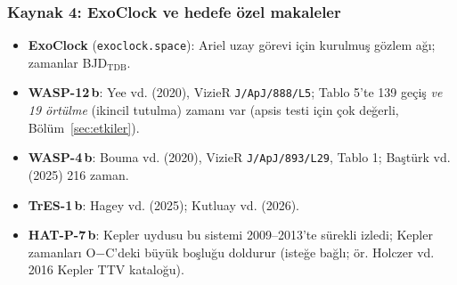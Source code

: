 \subsubsection*{Kaynak 4: ExoClock ve hedefe özel makaleler}
\begin{itemize}[leftmargin=*]
\item \textbf{ExoClock} (\texttt{exoclock.space}): Ariel uzay görevi için kurulmuş gözlem ağı; zamanlar BJD$_\mathrm{TDB}$.
\item \textbf{WASP-12\,b}: Yee vd. (2020), VizieR \texttt{J/ApJ/888/L5}; Tablo 5'te 139 geçiş \emph{ve 19 örtülme}
      (ikincil tutulma) zamanı var (apsis testi için çok değerli, Bölüm~\ref{sec:etkiler}).
\item \textbf{WASP-4\,b}: Bouma vd. (2020), VizieR \texttt{J/ApJ/893/L29}, Tablo 1; Baştürk vd. (2025) 216 zaman.
\item \textbf{TrES-1\,b}: Hagey vd. (2025); Kutluay vd. (2026).
\item \textbf{HAT-P-7\,b}: Kepler uydusu bu sistemi 2009–2013'te sürekli izledi; Kepler zamanları O$-$C'deki büyük
      boşluğu doldurur (isteğe bağlı; ör. Holczer vd. 2016 Kepler TTV kataloğu).
\end{itemize}

